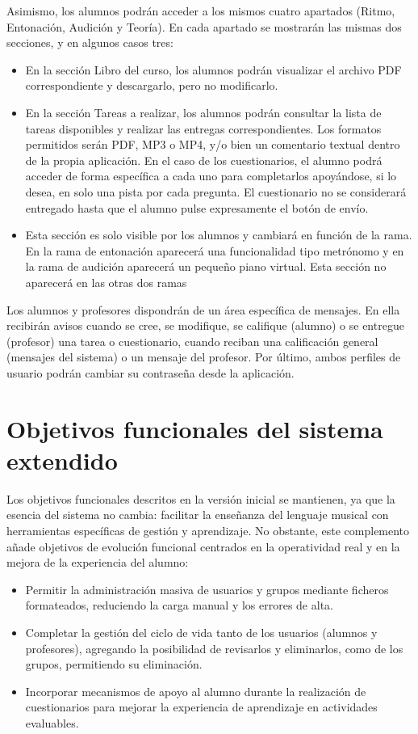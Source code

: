 Asimismo, los alumnos podrán acceder a los mismos cuatro apartados (Ritmo, Entonación, Audición y Teoría). En cada apartado se mostrarán las mismas dos secciones, y en algunos casos tres:
\begin{itemize}
\item En la sección Libro del curso, los alumnos podrán visualizar el archivo PDF correspondiente y descargarlo, pero no modificarlo.
\item En la sección Tareas a realizar, los alumnos podrán consultar la lista de tareas disponibles y realizar las entregas correspondientes. Los formatos permitidos serán PDF, MP3 o MP4, y/o bien un comentario textual dentro de la propia aplicación. En el caso de los cuestionarios, el alumno podrá acceder de forma específica a cada uno para completarlos apoyándose, si lo desea, en solo una pista por cada pregunta. El cuestionario no se considerará entregado hasta que el alumno pulse expresamente el botón de envío.
\item Esta sección es solo visible por los alumnos y cambiará en función de la rama. En la rama de entonación aparecerá una funcionalidad tipo metrónomo y en la rama de audición aparecerá un pequeño piano virtual. Esta sección no aparecerá en las otras dos ramas
\end{itemize}

Los alumnos y profesores dispondrán de un área específica de mensajes. En ella recibirán avisos cuando se cree, se modifique, se califique (alumno) o se entregue (profesor) una tarea o cuestionario, cuando reciban una calificación general (mensajes del sistema) o un mensaje del profesor. Por último, ambos perfiles de usuario podrán cambiar su contraseña desde la aplicación.
\section{Objetivos funcionales del sistema extendido}
\label{sec:objetivos_funcionales_ext}

Los objetivos funcionales descritos en la versión inicial se mantienen, ya que la esencia del sistema no cambia: facilitar la enseñanza del lenguaje musical con herramientas específicas de gestión y aprendizaje. No obstante, este complemento añade objetivos de evolución funcional centrados en la operatividad real y en la mejora de la experiencia del alumno:

\begin{itemize}
  \item Permitir la administración masiva de usuarios y grupos mediante ficheros formateados, reduciendo la carga manual y los errores de alta.
  \item Completar la gestión del ciclo de vida tanto de los usuarios (alumnos y profesores), agregando la posibilidad de revisarlos y eliminarlos, como de los grupos, permitiendo su eliminación.
  \item Incorporar mecanismos de apoyo al alumno durante la realización de cuestionarios para mejorar la experiencia de aprendizaje en actividades evaluables.
\end{itemize}
\newpage
